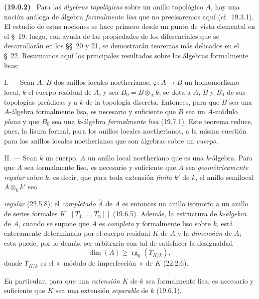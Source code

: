 \documentclass[10pt,oneside]{book}
\makeatletter
\newcommand{\setmanualcurrentlabel}[1]{\def\@currentlabel{#1}}
\newcommand{\oldpage}[2][]{%
  \setcounter{footnote}{0}%
  \marginpar{\scriptsize\textbf{#1}~|~#2}\ignorespaces}
\newenvironment{env}[1][]{\setmanualcurrentlabel{#1}\par\medskip\noindent\textbf{(#1)}\ }{\par}
\makeatother
\begin{document}
\begin{env}[19.0.2]
\label{0.19.0.2-es}
Para las \emph{álgebras topológicas} sobre un anillo topológico $A$, hay una
noción análoga de álgebra \emph{formalmente lisa} que no precisaremos
aquí (cf.~19.3.1). El estudio de estas nociones se hace primero desde un punto de vista
elemental en el §~19; luego, con ayuda de las propiedades de los diferenciales que
se desarrollarán en los §§~20 y 21, se demostrarán teoremas más delicados
en el §~22. Resumamos aquí los principales resultados sobre las álgebras formalmente
lisas:

\medskip\noindent I. --- Sean $A$, $B$ dos anillos locales
noetherianos, $\varphi:A\to B$ un homomorfismo local, $k$ el cuerpo residual de
$A$, y sea $B_0=B\otimes_A k$; se dota a $A$, $B$ y $B_0$ de sus
topologías preádicas y a $k$ de la topología discreta. Entonces, para que $B$ sea
una $A$-álgebra formalmente lisa, es necesario y suficiente que $B$ sea un
$A$-módulo \emph{plano} y que $B_0$ sea una $k$-álgebra \emph{formalmente
lisa} (19.7.1). Este teorema reduce, pues, la lisura formal, para los anillos
locales noetherianos, a la misma cuestión para los anillos locales noetherianos que
son álgebras sobre un \emph{cuerpo}.

\medskip\noindent II. --- Sean $k$ un cuerpo, $A$ un anillo local
noetheriano que es una $k$-álgebra. Para que $A$ sea formalmente liso, es
necesario y suficiente que $A$ sea \emph{geométricamente regular} sobre $k$,
es decir, que para toda extensión \emph{finita} $k'$ de $k$, el anillo
semilocal $A\otimes_k k'$ sea

\oldpage[0\textsubscript{IV-1}]{70}

\noindent \emph{regular} (22.5.8); el \emph{completado} $\widehat A$ de $A$ es entonces
un anillo isomorfo a un anillo de series formales
$K[[T_1,\ldots,T_n]]$ (19.6.5). Además, la estructura de \emph{$k$-álgebra} de $A$,
cuando se supone que $A$ es \emph{completo} y formalmente liso sobre $k$, está
enteramente determinada por el cuerpo residual $K$ de $A$ y la \emph{dimensión}
de $A$; esta puede, por lo demás, ser arbitraria con tal de satisfacer la
desigualdad
\[
  \dim(A)\geq \operatorname{rg}_k(\Upsilon_{K/k}),
\]
donde $\Upsilon_{K/k}$ es el «~módulo de imperfección~» de $K$ (22.2.6).

En particular, para que una \emph{extensión} $K$ de $k$ sea formalmente
lisa, es necesario y suficiente que $K$ sea una extensión \emph{separable} de $k$
(19.6.1).


\end{env}
\end{document}
